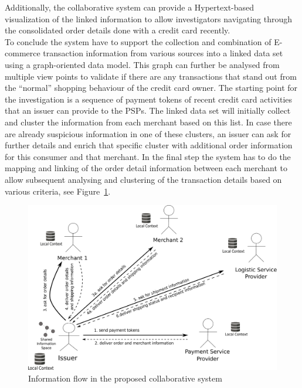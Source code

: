Additionally, the collaborative system can provide a Hypertext-based visualization of the linked information to allow investigators navigating through the consolidated order details done with a credit card recently. \\

To conclude the system have to support the collection and combination of \gls{E-commerce} transaction information from various sources into a linked data set using a graph-oriented data model. This graph can further be analysed from multiple view points to validate if there are any transactions that stand out from the ``normal'' shopping behaviour of the credit card owner. The starting point for the investigation is a sequence of payment tokens of recent credit card activities that an issuer can provide to the \gls{PSP}s. The linked data set will initially collect and cluster the information from each merchant based on this list. In case there are already suspicious information in one of these clusters, an issuer can ask for further details and enrich that specific cluster with additional order information for this consumer and that merchant. In the final step the system has to do the mapping and linking of the order detail information between each merchant to allow subsequent analysing and clustering of the transaction details based on various criteria, see Figure~\ref{fig:system_workflow}.

\begin{figure}[H]
  \centering
  \includegraphics[width=0.7\columnwidth]{images/system_P2P_decentralized.pdf}
  \caption{Information flow in the proposed collaborative system}
\label{fig:system_workflow}
\end{figure}

